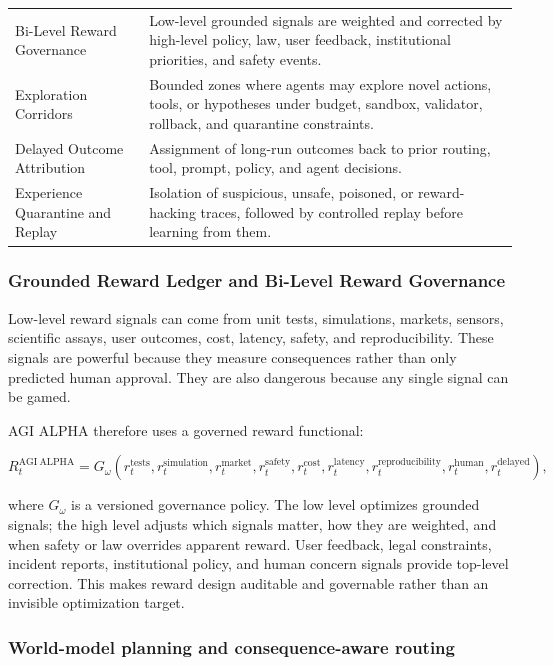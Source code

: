 \documentclass[11pt]{article}
\begin{document}
\begin{longtable}[]{@{}
  >{\raggedright\arraybackslash}p{}
  >{\raggedright\arraybackslash}p{}@{}}
Bi-Level Reward Governance & Low-level grounded signals are weighted and corrected by high-level policy, law, user feedback, institutional priorities, and safety events. \\
Exploration Corridors & Bounded zones where agents may explore novel actions, tools, or hypotheses under budget, sandbox, validator, rollback, and quarantine constraints. \\
Delayed Outcome Attribution & Assignment of long-run outcomes back to prior routing, tool, prompt, policy, and agent decisions. \\
Experience Quarantine and Replay & Isolation of suspicious, unsafe, poisoned, or reward-hacking traces, followed by controlled replay before learning from them. \\
\end{longtable}

\subsubsection{Grounded Reward Ledger and Bi-Level Reward Governance}\label{grounded-reward-ledger-and-bi-level-reward-governance}

Low-level reward signals can come from unit tests, simulations, markets, sensors, scientific assays, user outcomes, cost, latency, safety, and reproducibility. These signals are powerful because they measure consequences rather than only predicted human approval. They are also dangerous because any single signal can be gamed.

AGI ALPHA therefore uses a governed reward functional:

\[
R_t^{\mathrm{AGI\ ALPHA}}
=
G_\omega\left(r_t^{\mathrm{tests}},r_t^{\mathrm{simulation}},r_t^{\mathrm{market}},r_t^{\mathrm{safety}},r_t^{\mathrm{cost}},r_t^{\mathrm{latency}},r_t^{\mathrm{reproducibility}},r_t^{\mathrm{human}},r_t^{\mathrm{delayed}}\right),
\]

where \(G_\omega\) is a versioned governance policy. The low level optimizes grounded signals; the high level adjusts which signals matter, how they are weighted, and when safety or law overrides apparent reward. User feedback, legal constraints, incident reports, institutional policy, and human concern signals provide top-level correction. This makes reward design auditable and governable rather than an invisible optimization target.

\subsubsection{World-model planning and consequence-aware routing}\label{world-model-planning-and-consequence-aware-routing}
\end{document}
